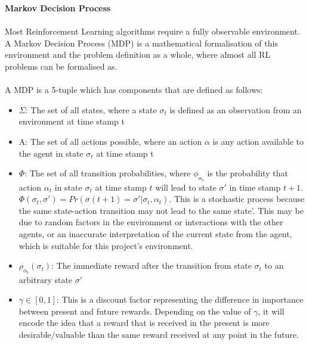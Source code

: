 \documentclass[ %
                    author={Ashwinder Khurana},
                supervisor={Prof Dave Cliff},
                    degree={MEng},
                     title={The Deeply Reinforced Trader},
                  subtitle={},
                      type={enterprise},
                      year={2020} ]{dissertation}
\begin{document}
\noindent
\textbf{Markov Decision Process}
\\
\\
Most Reinforcement Learning algorithms require a fully observable environment. A Markov Decision Process (MDP) is a mathematical formalisation of this environment and the problem definition as a whole, where almost all RL problems can be formalised as. 
\\
\\
\noindent 
A MDP is a 5-tuple which has components that are defined as follows:
\begin{itemize}
\item $\Sigma$: The set of all states, where a state $\sigma_t$ is defined as an observation from an 
environment at time stamp t
\item  A: The set of all actions possible, where an action $\alpha$ is any action available to the agent in state $\sigma_t$ at time stamp t
\item $\Phi$: The set of all transition probabilities, where $\phi_{\alpha_t}$ is the probability that action $\alpha_t$ in state $\sigma_t$ at time stamp $t$ will lead to state $\sigma'$ in time stamp $t+1$. 
$\Phi(\sigma_t, \sigma') = Pr(\sigma(t+1) = \sigma' | \sigma_t, \alpha_t)$. This is a stochastic process because the same state-action transition may not lead to the same state'. This may be due to random factors in the environment or interactions with the other agents, or an inaccurate interpretation of the current state from the agent, which is suitable for this project's environment. 
\item $\rho_{\alpha_t}(\sigma_t)$: The immediate reward after the transition from state $\sigma_t$ to an arbitrary state $\sigma'$ 
\item $\gamma \in [0,1]$: This is a discount factor representing the difference in importance between present and future rewards. Depending on the value of $\gamma$, it will encode the idea that a reward that is received in the present is more desirable/valuable than the same reward received at any point in the future. 



\end{itemize}
\vspace{0.5cm}
\noindent
\end{document}
